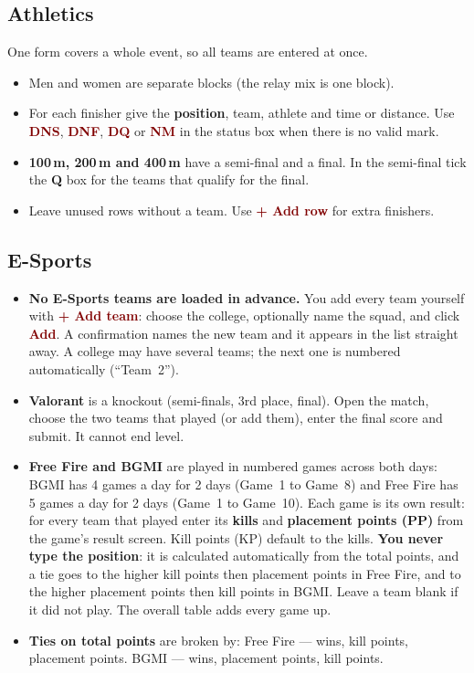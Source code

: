 \documentclass[11pt,a4paper]{article}
\newcommand{\ui}[1]{\textbf{\textcolor{maroon}{#1}}}
\begin{document}
\subsection{Athletics}
One form covers a whole event, so all teams are entered at once.
\begin{itemize}
  \item Men and women are separate blocks (the relay mix is one block).
  \item For each finisher give the \textbf{position}, team, athlete and time or distance. Use \ui{DNS}, \ui{DNF}, \ui{DQ} or \ui{NM} in the status box when there is no valid mark.
  \item \textbf{100\,m, 200\,m and 400\,m} have a semi-final and a final. In the semi-final tick the \textbf{Q} box for the teams that qualify for the final.
  \item Leave unused rows without a team. Use \ui{+ Add row} for extra finishers.
\end{itemize}

\subsection{E-Sports}
\begin{itemize}
  \item \textbf{No E-Sports teams are loaded in advance.} You add every team yourself with \ui{+ Add team}: choose the college, optionally name the squad, and click \ui{Add}. A confirmation names the new team and it appears in the list straight away. A college may have several teams; the next one is numbered automatically (``Team~2'').
  \item \textbf{Valorant} is a knockout (semi-finals, 3rd place, final). Open the match, choose the two teams that played (or add them), enter the final score and submit. It cannot end level.
  \item \textbf{Free Fire and BGMI} are played in numbered games across both days: BGMI has 4 games a day for 2 days (Game~1 to Game~8) and Free Fire has 5 games a day for 2 days (Game~1 to Game~10). Each game is its own result: for every team that played enter its \textbf{kills} and \textbf{placement points (PP)} from the game's result screen. Kill points (KP) default to the kills. \textbf{You never type the position}: it is calculated automatically from the total points, and a tie goes to the higher kill points then placement points in Free Fire, and to the higher placement points then kill points in BGMI. Leave a team blank if it did not play. The overall table adds every game up.
  \item \textbf{Ties on total points} are broken by: Free Fire --- wins, kill points, placement points. BGMI --- wins, placement points, kill points.
\end{itemize}
\end{document}

